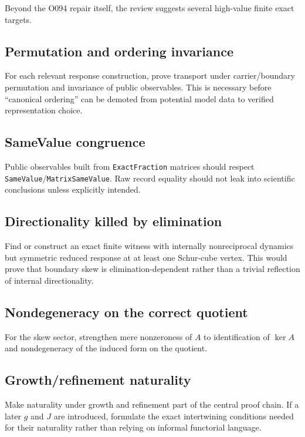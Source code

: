 \documentclass[11pt,a4paper]{article}
\begin{document}
Beyond the O094 repair itself, the review suggests several high-value finite exact targets.

\subsection{Permutation and ordering invariance}

For each relevant response construction, prove transport under carrier/boundary permutation and invariance of public observables. This is necessary before ``canonical ordering'' can be demoted from potential model data to verified representation choice.

\subsection{SameValue congruence}

Public observables built from \texttt{ExactFraction} matrices should respect \texttt{SameValue}/\texttt{MatrixSameValue}. Raw record equality should not leak into scientific conclusions unless explicitly intended.

\subsection{Directionality killed by elimination}

Find or construct an exact finite witness with internally nonreciprocal dynamics but symmetric reduced response at at least one Schur-cube vertex. This would prove that boundary skew is elimination-dependent rather than a trivial reflection of internal directionality.

\subsection{Nondegeneracy on the correct quotient}

For the skew sector, strengthen mere nonzeroness of $A$ to identification of $\ker A$ and nondegeneracy of the induced form on the quotient.

\subsection{Growth/refinement naturality}

Make naturality under growth and refinement part of the central proof chain. If a later $g$ and $J$ are introduced, formulate the exact intertwining conditions needed for their naturality rather than relying on informal functorial language.
\end{document}
